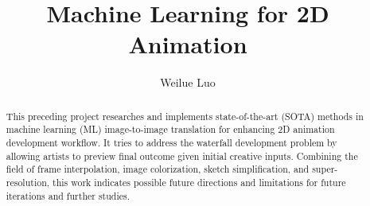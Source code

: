 
\title{Machine Learning for 2D Animation}
\author{Weilue Luo}

\maketitle
\makedeclaration

\begin{abstract} %
This preceding project researches and implements state-of-the-art (SOTA) methods in machine learning (ML) image-to-image translation for enhancing 2D animation development workflow. It tries to address the waterfall development problem by allowing artists to preview final outcome given initial creative inputs. Combining the field of frame interpolation, image colorization, sketch simplification, and super-resolution, this work indicates possible future directions and limitations for future iterations and further studies.
\end{abstract}


